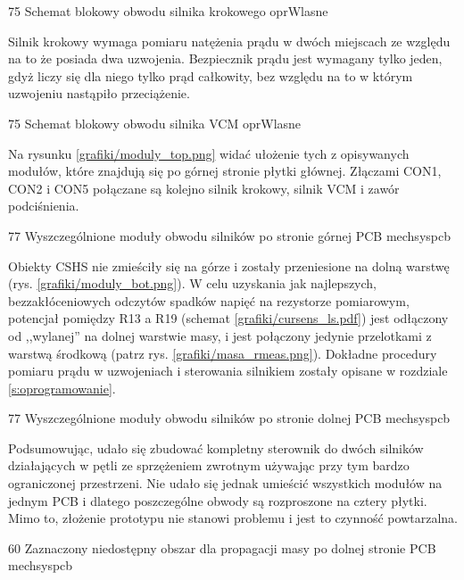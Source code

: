 	{75}
	{Schemat blokowy obwodu silnika krokowego}
	{oprWlasne}
	
Silnik krokowy wymaga pomiaru natężenia prądu w dwóch miejscach ze względu na to że posiada dwa uzwojenia. Bezpiecznik prądu jest wymagany tylko jeden, gdyż liczy się dla niego tylko prąd całkowity, bez względu na to w którym uzwojeniu nastąpiło przeciążenie. 

	{75}
	{Schemat blokowy obwodu silnika VCM}
	{oprWlasne}

Na rysunku \ref{grafiki/moduly_top.png} widać ułożenie tych z opisywanych modułów, które znajdują się po górnej stronie płytki głównej. Złączami CON1, CON2 i CON5 połączane są kolejno silnik krokowy, silnik VCM i zawór podciśnienia.
	
	{77}
	{Wyszczególnione moduły obwodu silników po stronie górnej PCB}
	{mechsyspcb}
	
Obiekty CSHS nie zmieściły się na górze i zostały przeniesione na dolną warstwę (rys. \ref{grafiki/moduly_bot.png}). W celu uzyskania jak najlepszych, bezzakłóceniowych odczytów spadków napięć na rezystorze pomiarowym, potencjał pomiędzy R13 a R19 (schemat \ref{grafiki/cursens_ls.pdf}) jest odłączony od ,,wylanej'' na dolnej warstwie masy, i jest połączony jedynie przelotkami z warstwą środkową (patrz rys. \ref{grafiki/masa_rmeas.png}). Dokładne procedury pomiaru prądu w uzwojeniach i sterowania silnikiem zostały opisane w rozdziale \ref{s:oprogramowanie}. 

	{77}
	{Wyszczególnione moduły obwodu silników po stronie dolnej PCB}
	{mechsyspcb}

Podsumowując, udało się zbudować kompletny sterownik do dwóch silników działających w pętli ze sprzężeniem zwrotnym używając przy tym bardzo ograniczonej przestrzeni. Nie udało się jednak umieścić wszystkich modułów na jednym PCB i dlatego poszczególne obwody są rozproszone na cztery płytki. Mimo to, złożenie prototypu nie stanowi problemu i jest to czynność powtarzalna.

	{60}
	{Zaznaczony niedostępny obszar dla propagacji masy po dolnej stronie PCB}
	{mechsyspcb}


\clearpage














